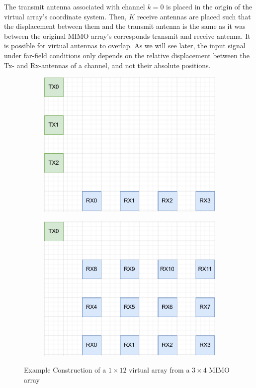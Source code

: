 The transmit antenna associated with channel $k=0$ is placed in the origin of the virtual array's coordinate system.
Then, $K$ receive antennas are placed such that the displacement between them and the transmit antenna
is the same as it was between the original MIMO array's corresponds transmit and receive antenna.
It is possible for virtual antennas to overlap.
As we will see later, the input signal under far-field conditions only depends
on the relative displacement between the Tx- and Rx-antennas of a channel, and not their absolute positions.

\begin{figure}
    \begin{subfigure}{.4\textwidth}
        \includegraphics[width=\textwidth]{../figures/drawio_3x4_MIMO.pdf}
        \label{fig:mimo_example}
    \end{subfigure}
    \hfill
    \begin{subfigure}{.4\textwidth}
        \includegraphics[width=\textwidth]{../figures/drawio_1x12_SIMO.pdf}
        \label{fig:simo_example}
    \end{subfigure}
    \caption{Example Construction of a $1\times12$ virtual array from a $3\times4$ MIMO array}
\end{figure}
